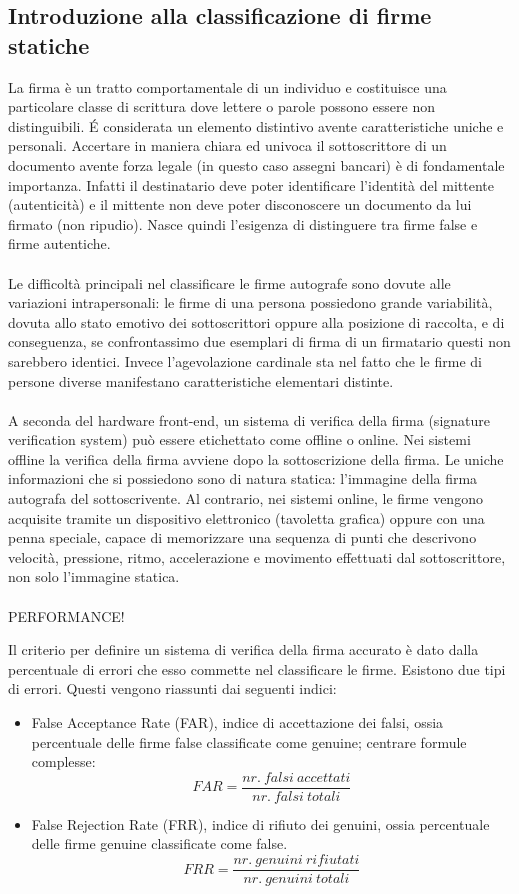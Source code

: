 \subsection{Introduzione alla classificazione di firme statiche}
\label{2.1}
La firma è un tratto comportamentale di un individuo e costituisce una particolare classe di scrittura dove lettere o parole possono essere non distinguibili. \'{E} considerata un elemento distintivo avente caratteristiche uniche e personali. Accertare in maniera chiara ed univoca il sottoscrittore di un documento avente forza legale (in questo caso assegni bancari) è di fondamentale importanza. Infatti il destinatario deve poter identificare l'identità del mittente (autenticità) e il mittente non deve poter disconoscere un documento da lui firmato (non ripudio). Nasce quindi l'esigenza di distinguere tra firme false e firme autentiche.\\\\
Le difficoltà principali nel classificare le firme autografe sono dovute alle variazioni intrapersonali: le firme di una persona possiedono grande variabilità, dovuta allo stato emotivo dei sottoscrittori oppure alla posizione di raccolta, e di conseguenza, se confrontassimo due esemplari di firma di un firmatario questi non sarebbero identici. Invece l'agevolazione cardinale sta nel fatto che le firme di persone diverse manifestano caratteristiche elementari distinte.\\\\
A seconda del hardware front-end, un sistema di verifica della firma (signature verification system) può essere etichettato come offline o online. Nei sistemi offline la verifica della firma avviene dopo la sottoscrizione della firma. Le uniche informazioni che si possiedono sono di natura statica: l'immagine della firma autografa del sottoscrivente. Al contrario, nei sistemi online, le firme vengono acquisite tramite un dispositivo elettronico (tavoletta grafica) oppure con una penna speciale, capace di memorizzare una sequenza di punti che descrivono velocità, pressione, ritmo, accelerazione e movimento effettuati dal sottoscrittore, non solo l'immagine statica.\\\\

PERFORMANCE!

Il criterio per definire un sistema di verifica della firma accurato è dato dalla percentuale di errori che esso commette nel classificare le firme. Esistono due tipi di errori. Questi vengono riassunti dai seguenti indici:
\begin{itemize}
\item False Acceptance Rate (FAR), indice di accettazione dei falsi, ossia percentuale delle firme false classificate come genuine;
centrare formule complesse:
\[FAR =
\frac{nr.\ falsi\ accettati}{nr.\ falsi\ totali}
\]
\item False Rejection Rate (FRR), indice di rifiuto dei genuini, ossia percentuale delle firme genuine classificate come false.
\[FRR =
\frac{nr.\ genuini\ rifiutati}{nr.\ genuini\ totali}
\]
\end{itemize}

